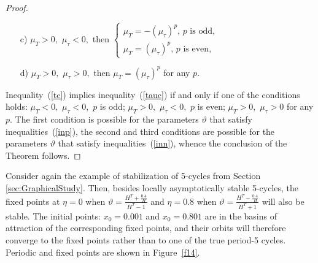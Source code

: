\documentclass[12pt,a4paper]{amsart}
\begin{document}
\begin{proof}
\begin{enumerate}
\medskip
\item[c)] $\mu_T>0,$ $\mu_\tau<0,$ then 
$\left\{\begin{array}{ll}
\mu_T = -(\mu_\tau)^p,\, p \text{ is odd}, \\
\mu_T = (\mu_\tau)^p,\, p \text{ is even},
\end{array}\right.$

\medskip
\item[d)] $\mu_T>0,$ $\mu_\tau>0,$ then $\mu_T = (\mu_\tau)^p$ for any $p.$  
\end{enumerate}

Inequality~(\ref{tc}) implies inequality~(\ref{tauc}) if and only if one of the conditions holds: $\mu_T<0,$ $\mu_\tau<0,$ $p$ is odd; 
$\mu_T>0,$ $\mu_\tau<0,$ $p$ is even; $\mu_T>0,$ $\mu_\tau>0$ for any $p.$ The first condition is possible for the parameters $\vartheta$ that satisfy 
inequalities~(\ref{inp}), the second and third conditions are possible for the parameters $\vartheta$ that satisfy inequalities~(\ref{inn}), whence the conclusion 
of the Theorem follows.
\end{proof}

Consider again the example of stabilization of 5-cycles from Section \ref{sec:GraphicalStudy}.  Then, besides locally 
asymptotically stable 5-cycles, the fixed points at $\eta=0$ when $\vartheta = \frac{H^T + \frac{0.4}{H}}{H^T - 1}$ and $\eta=0.8$ when
$\vartheta = \frac{H^T - \frac{0.4}{H}}{H^T + 1}$ will also be stable. The initial points: $x_0=0.001$ and $x_0=0.801$ are in the basins of attraction of the corresponding fixed points, and their orbits will therefore converge to the fixed points rather than to one of the true period-5 cycles.  Periodic and fixed points are shown in Figure~\ref{f14}.
\end{document}
